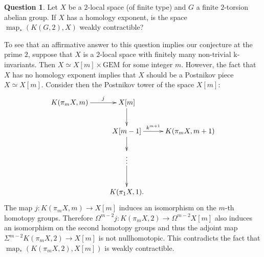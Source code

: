 \documentclass{amsart}
\theoremstyle{definition}
\newtheorem*{quest*}{Question}
\theoremstyle{remark}
\DeclareMathOperator{\map}{map}
\begin{document}
\begin{quest*}
Let $X$ be a $2$-local space (of finite type) and $G$ a finite $2$-torsion abelian group. If $X$ has a homology exponent, is the space $\map_*(K(G,2),X)$ weakly contractible?
\end{quest*}

To see that an affirmative answer to this question implies our conjecture at the prime $2$, suppose that $X$ is a $2$-local space with finitely many non-trivial k-invariants. Then $X\simeq X[m]\times\text{GEM}$ for some integer $m$. However, the fact that $X$ has no homology exponent implies that $X$ should be a Postnikov piece $X\simeq X[m]$. Consider then the Postnikov tower of the space $X[m]$:
$$\xymatrix{
K(\pi_mX,m)\ar[r]^-j &X[m]\ar[d]\\
&X[m-1]\ar[d]\ar[r]^-{k^{m+1}} &K(\pi_mX,m+1)\\
&\vdots\ar[d]\\
&K(\pi_1X,1).
}$$ The map $j:K(\pi_m X,m)\to X[m]$ induces an isomorphism on the $m$-th homotopy groups. Therefore $\Omega^{m-2}j:K(\pi_m X,2)\to\Omega^{m-2}X[m]$ also induces an isomorphism on the second homotopy groups and thus the adjoint map $\Sigma^{m-2}K(\pi_m X,2)\to X[m]$ is not nullhomotopic. This contradicts the fact that $\map_*(K(\pi_mX,2),X[m])$ is weakly contractible.

\bigskip

\end{document}
